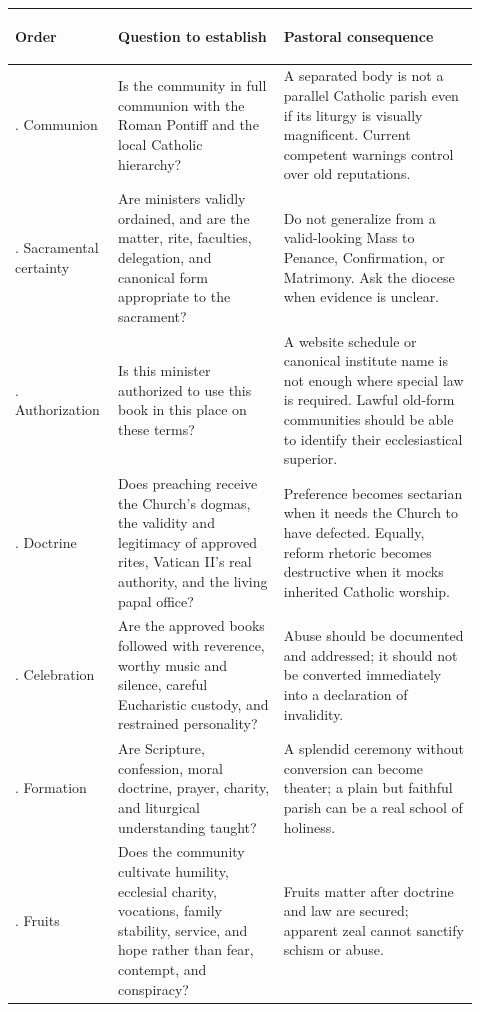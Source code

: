\begin{longtable}{>{\bfseries\raggedright\arraybackslash}p{0.18\linewidth}>{\raggedright\arraybackslash}p{0.34\linewidth}>{\raggedright\arraybackslash}p{0.40\linewidth}}
\toprule
\textbf{Order} & \textbf{Question to establish} & \textbf{Pastoral consequence}\\
\midrule
\endhead
1. Communion & Is the community in full communion with the Roman Pontiff and the local Catholic hierarchy? & A separated body is not a parallel Catholic parish even if its liturgy is visually magnificent. Current competent warnings control over old reputations.\\
2. Sacramental certainty & Are ministers validly ordained, and are the matter, rite, faculties, delegation, and canonical form appropriate to the sacrament? & Do not generalize from a valid-looking Mass to Penance, Confirmation, or Matrimony. Ask the diocese when evidence is unclear.\\
3. Authorization & Is this minister authorized to use this book in this place on these terms? & A website schedule or canonical institute name is not enough where special law is required. Lawful old-form communities should be able to identify their ecclesiastical superior.\\
4. Doctrine & Does preaching receive the Church's dogmas, the validity and legitimacy of approved rites, Vatican II's real authority, and the living papal office? & Preference becomes sectarian when it needs the Church to have defected. Equally, reform rhetoric becomes destructive when it mocks inherited Catholic worship.\\
5. Celebration & Are the approved books followed with reverence, worthy music and silence, careful Eucharistic custody, and restrained personality? & Abuse should be documented and addressed; it should not be converted immediately into a declaration of invalidity.\\
6. Formation & Are Scripture, confession, moral doctrine, prayer, charity, and liturgical understanding taught? & A splendid ceremony without conversion can become theater; a plain but faithful parish can be a real school of holiness.\\
7. Fruits & Does the community cultivate humility, ecclesial charity, vocations, family stability, service, and hope rather than fear, contempt, and conspiracy? & Fruits matter after doctrine and law are secured; apparent zeal cannot sanctify schism or abuse.\\
\bottomrule
\end{longtable}

